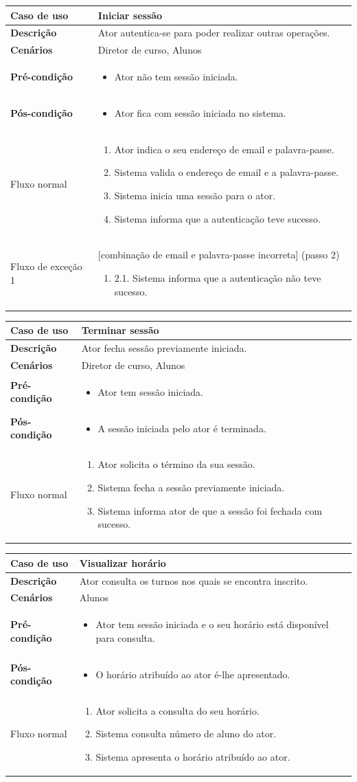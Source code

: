 \documentclass[12pt, a4paper]{article}
\newenvironment{condition}{
    \begin{itemize}[wide=0pt]
        \vspace{-0.2cm}
}{
        \vspace{-0.5cm}
    \end{itemize}
}
\newcommand\flow[1]{
    Fluxo normal &
    \singlespacing
    \begin{enumerate}[wide=0pt]
        #1
        \vspace{-0.3cm}
    \end{enumerate} \\ \hline
}
\newcommand\otherflow[3]{
    #1 &
    #2
    \singlespacing
    \begin{enumerate}[wide=0pt]
        #3
        \vspace{-0.3cm}
    \end{enumerate} \\ \hline
}
\newenvironment{usecase}[5]{
    \begin{table}[H]
        \centering
        \begin{tabular}{|>{\centering\arraybackslash\bf}m{3cm}|m{13cm}|}
            \hline
            Caso de uso & \textbf{#1} \\

            \hline
            Descrição & #2 \\

            \hline
            Cenários & #3 \\

            \hline
            Pré-condição &
            \begin{condition}
                #4
            \end{condition} \\

            \hline
            Pós-condição &
            \begin{condition}
                #5
            \end{condition} \\

            \hline
}{
    \end{tabular}
\end{table}
}
\begin{document}
\begin{usecase}
    {Iniciar sessão}
    {Ator autentica-se para poder realizar outras operações.}
    {Diretor de curso, Alunos}
    {\item Ator não tem sessão iniciada.}
    {\item Ator fica com sessão iniciada no sistema.}

    \flow{
        \item Ator indica o seu endereço de email e palavra-passe.
        \item Sistema valida o endereço de email e a palavra-passe.
        \item Sistema inicia uma sessão para o ator.
        \item Sistema informa que a autenticação teve sucesso.
    }

    \otherflow{Fluxo de exceção 1}{[combinação de email e palavra-passe incorreta] (passo 2)}{
        \item[2.1.] Sistema informa que a autenticação não teve sucesso.
    }
\end{usecase}

\begin{usecase}
    {Terminar sessão}
    {Ator fecha sessão previamente iniciada.}
    {Diretor de curso, Alunos}
    {\item Ator tem sessão iniciada.}
    {\item A sessão iniciada pelo ator é terminada.}

    \flow{
        \item Ator solicita o término da sua sessão.
        \item Sistema fecha a sessão previamente iniciada.
        \item Sistema informa ator de que a sessão foi fechada com sucesso.
    }
\end{usecase}

\begin{usecase}
    {Visualizar horário}
    {Ator consulta os turnos nos quais se encontra inscrito.}
    {Alunos}
    {\item Ator tem sessão iniciada e o seu horário está disponível para consulta.}
    {\item O horário atribuído ao ator é-lhe apresentado.}

    \flow{
        \item Ator solicita a consulta do seu horário.
        \item Sistema consulta número de aluno do ator.
        \item Sistema apresenta o horário atribuído ao ator.
    }
\end{usecase}
\end{document}
